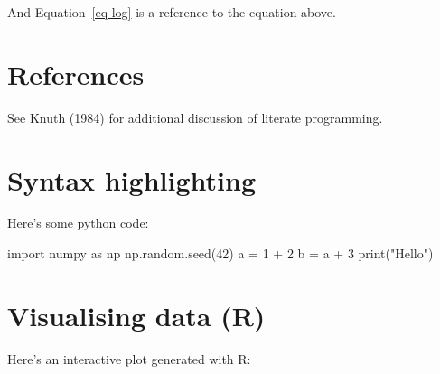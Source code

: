 \documentclass[
  letterpaper,
  DIV=11,
  numbers=noendperiod]{scrreprt}
\newenvironment{Shaded}{\begin{snugshade}}{\end{snugshade}}
\newcommand{\BuiltInTok}[1]{\textcolor[rgb]{0.00,0.23,0.31}{#1}}
\newcommand{\DecValTok}[1]{\textcolor[rgb]{0.68,0.00,0.00}{#1}}
\newcommand{\ImportTok}[1]{\textcolor[rgb]{0.00,0.46,0.62}{#1}}
\newcommand{\NormalTok}[1]{\textcolor[rgb]{0.00,0.23,0.31}{#1}}
\newcommand{\OperatorTok}[1]{\textcolor[rgb]{0.37,0.37,0.37}{#1}}
\newcommand{\StringTok}[1]{\textcolor[rgb]{0.13,0.47,0.30}{#1}}
\theoremstyle{definition}
\theoremstyle{remark}
\begin{document}
And Equation~\ref{eq-log} is a reference to the equation above.

\section{References}\label{references-10}

See Knuth (1984) for additional discussion of literate programming.

\section{Syntax highlighting}\label{syntax-highlighting-10}

Here's some python code:

\begin{Shaded}
\begin{Highlighting}[]
\ImportTok{import}\NormalTok{ numpy }\ImportTok{as}\NormalTok{ np}
\NormalTok{np.random.seed(}\DecValTok{42}\NormalTok{)}
\NormalTok{a }\OperatorTok{=} \DecValTok{1} \OperatorTok{+} \DecValTok{2}
\NormalTok{b }\OperatorTok{=}\NormalTok{ a }\OperatorTok{+} \DecValTok{3}
\BuiltInTok{print}\NormalTok{(}\StringTok{"Hello"}\NormalTok{)}
\end{Highlighting}
\end{Shaded}

\section{Visualising data (R)}\label{visualising-data-r-10}

Here's an interactive plot generated with R:
\end{document}
